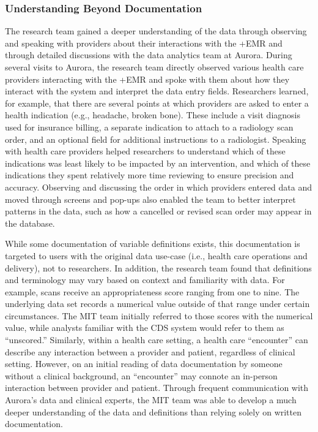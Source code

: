 \documentclass[
]{WileySix}
\begin{document}
\hypertarget{understanding-beyond-documentation}{%
\subsubsection{Understanding Beyond Documentation}\label{understanding-beyond-documentation}}

The research team gained a deeper understanding of the data through observing and speaking with providers about their interactions with the +EMR\textbar{} and through detailed discussions with the data analytics team at Aurora. During several visits to Aurora, the research team directly observed various health care providers interacting with the +EMR\textbar{} and spoke with them about how they interact with the system and interpret the data entry fields. Researchers learned, for example, that there are several points at which providers are asked to enter a health indication (e.g., headache, broken bone). These include a visit diagnosis used for insurance billing, a separate indication to attach to a radiology scan order, and an optional field for additional instructions to a radiologist. Speaking with health care providers helped researchers to understand which of these indications was least likely to be impacted by an intervention, and which of these indications they spent relatively more time reviewing to ensure precision and accuracy. Observing and discussing the order in which providers entered data and moved through screens and pop-ups also enabled the team to better interpret patterns in the data, such as how a cancelled or revised scan order may appear in the database.

While some documentation of variable definitions exists, this documentation is targeted to users with the original data use-case (i.e., health care operations and delivery), not to researchers. In addition, the research team found that definitions and terminology may vary based on context and familiarity with data. For example, scans receive an appropriateness score ranging from one to nine. The underlying data set records a numerical value outside of that range under certain circumstances. The MIT team initially referred to those scores with the numerical value, while analysts familiar with the CDS system would refer to them as ``unscored.'' Similarly, within a health care setting, a health care ``encounter'' can describe any interaction between a provider and patient, regardless of clinical setting. However, on an initial reading of data documentation by someone without a clinical background, an ``encounter'' may connote an in-person interaction between provider and patient. Through frequent communication with Aurora's data and clinical experts, the MIT team was able to develop a much deeper understanding of the data and definitions than relying solely on written documentation.
\end{document}
